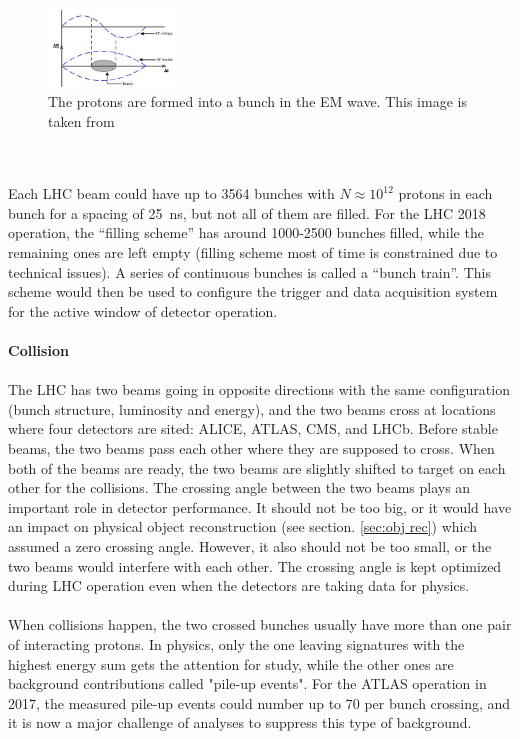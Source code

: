 \begin{figure}[!h]                
	\includegraphics[width=0.3\textwidth]{Chapter2/bunch.png}
	\centering
	\begin{center}
		\caption{The protons are formed into a bunch in the EM wave. This image is taken from \cite{Baird:1017689}}
		\label{Fig:bunch}            
	\end{center}
\end{figure}
\noindent
\\
\\Each LHC beam could have up to 3564 bunches with $N\approx 10^{12}$ protons in each bunch for a spacing of 25~ns, but not all of them are filled. For the LHC 2018 operation, the ``filling scheme''  has around 1000-2500 bunches filled, while the remaining ones are left empty (filling scheme most of time is constrained due to technical issues). A series of continuous bunches is called a ``bunch train''. This scheme would then be used to configure the trigger and data acquisition system for the active window of detector operation.
\\  
\\{\bf Collision}
\\
\\The LHC has two beams going in opposite directions with the same configuration (bunch structure, luminosity and energy), and the two beams cross at locations where four detectors are sited: ALICE\cite{alicetdr}, ATLAS\cite{atlastdr}, CMS\cite{cmstdr}, and LHCb\cite{lhcbtdr}. Before stable beams, the two beams pass each other where they are supposed to cross. When both of the beams are ready, the two beams are slightly shifted to target on each other for the collisions.  The crossing angle between the two beams plays an important role in detector performance. It should not be too big, or it would have an impact on physical object reconstruction (see section. \ref{sec:obj rec}) which assumed a zero crossing angle. However, it also should not be too small, or the two beams would interfere with each other. The crossing angle is kept optimized during LHC operation even when the detectors are taking data for physics.
\\
\\When collisions happen, the two crossed bunches usually have more than one pair of interacting protons. In physics, only the one leaving signatures with the highest energy sum gets the attention for study, while the other ones are background contributions called "pile-up events". For the ATLAS operation in 2017, the measured pile-up events could number up to 70 per bunch crossing, and it is now a major challenge of analyses to suppress this type of background.

